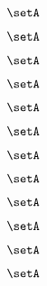 {\begin{forslides}
        \begin{equation}
            \label{eq:feedback-164}
            \setA
        \end{equation}

        \begin{equation}
            \label{eq:feedback-165}
            \setA
        \end{equation}

        \begin{equation}
            \label{eq:feedback-166}
            \setA
        \end{equation}

        \begin{equation}
            \label{eq:feedback-167}
            \setA
        \end{equation}

        \begin{equation}
            \label{eq:feedback-168}
            \setA
        \end{equation}

        \begin{equation}
            \label{eq:feedback-169}
            \setA
        \end{equation}

        \begin{equation}
            \label{eq:feedback-170}
            \setA
        \end{equation}

        \begin{equation}
            \label{eq:feedback-171}
            \setA
        \end{equation}

        \begin{equation}
            \label{eq:feedback-172}
            \setA
        \end{equation}

        \begin{equation}
            \label{eq:feedback-173}
            \setA
        \end{equation}

        \begin{equation}
            \label{eq:feedback-174}
            \setA
        \end{equation}

        \begin{equation}
            \label{eq:feedback-175}
            \setA
        \end{equation}


\end{forslides}}

